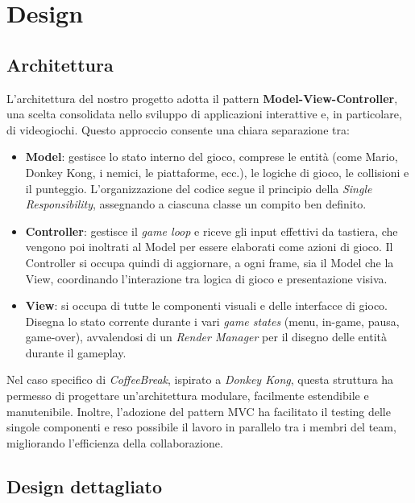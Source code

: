 \documentclass[a4paper,12pt]{report}
\begin{document}
\chapter{Design}
\section{Architettura}
L'architettura del nostro progetto adotta il pattern \textbf{Model-View-\newline Controller}, una scelta consolidata
nello sviluppo di applicazioni interattive e, in particolare, di videogiochi. Questo approccio consente una chiara separazione tra:

\begin{itemize}
	\item \textbf{Model}: gestisce lo stato interno del gioco, comprese le entità (come Mario, Donkey Kong, i nemici, le piattaforme, ecc.), le logiche di gioco, le collisioni e
	      il punteggio. L'organizzazione del codice segue il principio della \textit{Single Responsibility}, assegnando a ciascuna classe un compito ben definito.

	\item \textbf{Controller}: gestisce il \textit{game loop} e riceve gli input effettivi da tastiera, che vengono poi inoltrati al Model per essere elaborati come azioni di gioco. Il Controller
	      si occupa quindi di aggiornare, a ogni frame, sia il Model che la View, coordinando l'interazione tra logica di gioco e presentazione visiva.

	\item \textbf{View}: si occupa di tutte le componenti visuali e delle interfacce di gioco. Disegna lo stato corrente durante i vari \textit{game states} (menu, in-game, pausa, game-over),
	      avvalendosi di un \textit{Render Manager} per il disegno delle entità durante il gameplay.
\end{itemize}

Nel caso specifico di \textit{CoffeeBreak}, ispirato a \textit{Donkey Kong}, questa struttura ha permesso di progettare un'architettura modulare, facilmente
estendibile e manutenibile. Inoltre, l'adozione del pattern MVC ha facilitato il testing delle singole componenti e reso possibile il lavoro in parallelo tra i membri
del team, migliorando l'efficienza della collaborazione.

\section{Design dettagliato}
\end{document}
